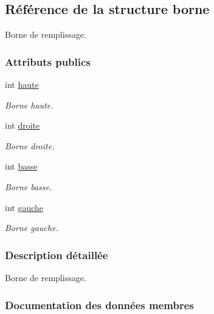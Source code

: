 \hypertarget{structborne}{}\subsection{Référence de la structure borne}
\label{structborne}


Borne de remplissage.  


\subsubsection*{Attributs publics}
\begin{DoxyCompactItemize}
\item 
int \hyperlink{structborne_a9bcfad7d4fb8ced90f1035b520cb6cd8}{haute}
\begin{DoxyCompactList}\small\item\em Borne haute. \end{DoxyCompactList}\item 
int \hyperlink{structborne_a04125ed007cc8fae491652a12105a146}{droite}
\begin{DoxyCompactList}\small\item\em Borne droite. \end{DoxyCompactList}\item 
int \hyperlink{structborne_a9bac7417a79567f0367c10b2eda3085e}{basse}
\begin{DoxyCompactList}\small\item\em Borne basse. \end{DoxyCompactList}\item 
int \hyperlink{structborne_a86d2017d73ee98af609c4ffeaef58643}{gauche}
\begin{DoxyCompactList}\small\item\em Borne gauche. \end{DoxyCompactList}\end{DoxyCompactItemize}


\subsubsection{Description détaillée}
Borne de remplissage. 

\subsubsection{Documentation des données membres}
\mbox{\label{structborne_a9bac7417a79567f0367c10b2eda3085e}} 
